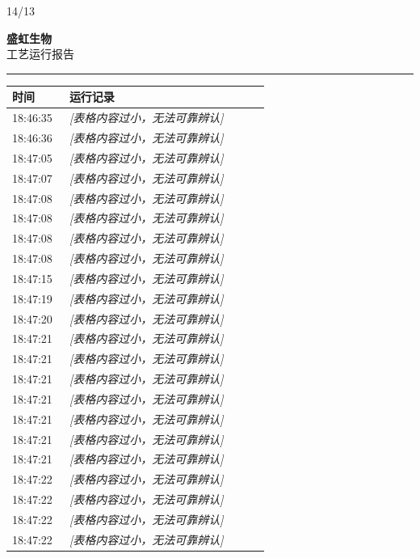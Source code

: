 \documentclass[UTF8,10pt,a4paper,fontset=fandol]{ctexart}
\newcommand{\handwritten}[1]{#1}
\begin{document}
\vfill

\handwritten{14/13}

\newpage

\begin{center}
\begin{minipage}[t]{0.47\linewidth}
\centering
\textbf{盛虹生物}\\[2pt]
工艺运行报告\\[-1pt]
\textcolor{yellow}{\rule{\linewidth}{0.6pt}}

\begin{tabular}{|p{0.20\linewidth}|p{0.70\linewidth}|}
\hline
时间 & 运行记录 \\ \hline
18:46:35 & \textit{[表格内容过小，无法可靠辨认]} \\ \hline
18:46:36 & \textit{[表格内容过小，无法可靠辨认]} \\ \hline
18:47:05 & \textit{[表格内容过小，无法可靠辨认]} \\ \hline
18:47:07 & \textit{[表格内容过小，无法可靠辨认]} \\ \hline
18:47:08 & \textit{[表格内容过小，无法可靠辨认]} \\ \hline
18:47:08 & \textit{[表格内容过小，无法可靠辨认]} \\ \hline
18:47:08 & \textit{[表格内容过小，无法可靠辨认]} \\ \hline
18:47:08 & \textit{[表格内容过小，无法可靠辨认]} \\ \hline
18:47:15 & \textit{[表格内容过小，无法可靠辨认]} \\ \hline
18:47:19 & \textit{[表格内容过小，无法可靠辨认]} \\ \hline
18:47:20 & \textit{[表格内容过小，无法可靠辨认]} \\ \hline
18:47:21 & \textit{[表格内容过小，无法可靠辨认]} \\ \hline
18:47:21 & \textit{[表格内容过小，无法可靠辨认]} \\ \hline
18:47:21 & \textit{[表格内容过小，无法可靠辨认]} \\ \hline
18:47:21 & \textit{[表格内容过小，无法可靠辨认]} \\ \hline
18:47:21 & \textit{[表格内容过小，无法可靠辨认]} \\ \hline
18:47:21 & \textit{[表格内容过小，无法可靠辨认]} \\ \hline
18:47:21 & \textit{[表格内容过小，无法可靠辨认]} \\ \hline
18:47:22 & \textit{[表格内容过小，无法可靠辨认]} \\ \hline
18:47:22 & \textit{[表格内容过小，无法可靠辨认]} \\ \hline
18:47:22 & \textit{[表格内容过小，无法可靠辨认]} \\ \hline
18:47:22 & \textit{[表格内容过小，无法可靠辨认]} \\ \hline
\end{tabular}


\end{minipage}
\end{center}
\end{document}
